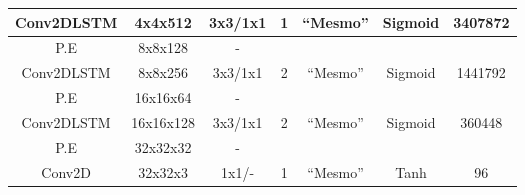 \begin{table}[htbp]
\begin{tabular}{|c|c|c|c|c|c|c|}
		Conv2DLSTM      & 4x4x512                                                              & 3x3/1x1                                                                                 & 1              & ``Mesmo''                   & Sigmoid                                                               & 3407872                                                                 \\ \hline
		P.E             & 8x8x128                                                              & -                                                                                       &                &                        &                                                                       &                                                                         \\ \hline
		Conv2DLSTM      & 8x8x256                                                              & 3x3/1x1                                                                                 & 2              & ``Mesmo''                   & Sigmoid                                                               & 1441792                                                                 \\ \hline
		P.E             & 16x16x64                                                             & -                                                                                       &                &                        &                                                                       &                                                                         \\ \hline
		Conv2DLSTM      & 16x16x128                                                            & 3x3/1x1                                                                                 & 2              & ``Mesmo''                   & Sigmoid                                                               & 360448                                                                  \\ \hline
		P.E             & 32x32x32                                                             & -                                                                                       &                &                        &                                                                       &                                                                         \\ \hline
		Conv2D          & 32x32x3                                                              & 1x1/-                                                                                   & 1              & ``Mesmo''                   & Tanh                                                                  & 96                                                                      \\ \hline

\end{tabular}
\end{table}
